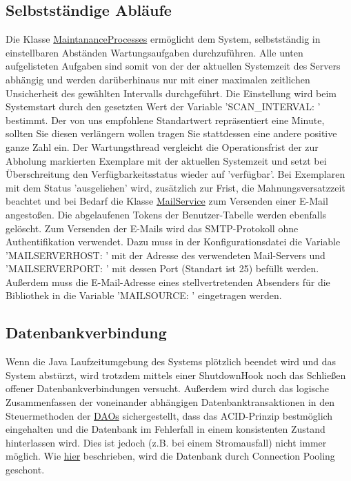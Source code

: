 \documentclass{article}
\begin{document}
\subsection{Selbstständige Abläufe}
Die Klasse \hyperlink{Logger}{MaintananceProcesses} ermöglicht dem System, selbstständig in einstellbaren Abständen Wartungsaufgaben durchzuführen. Alle unten aufgelisteten Aufgaben sind somit von der der aktuellen Systemzeit des Servers abhängig und werden darüberhinaus nur mit einer maximalen zeitlichen Unsicherheit des gewählten Intervalls durchgeführt. Die Einstellung wird beim Systemstart durch den gesetzten Wert der Variable 'SCAN\_INTERVAL: ' bestimmt. Der von uns empfohlene Standartwert repräsentiert eine Minute, sollten Sie diesen verlängern wollen tragen Sie stattdessen eine andere positive ganze Zahl ein. Der Wartungsthread vergleicht die Operationsfrist der zur Abholung markierten Exemplare mit der aktuellen Systemzeit und setzt bei Überschreitung den Verfügbarkeitsstatus wieder auf 'verfügbar'. Bei Exemplaren mit dem Status 'ausgeliehen' wird, zusätzlich zur Frist, die Mahnungsversatzzeit beachtet und bei Bedarf die Klasse \hyperlink{Session}{MailService} zum Versenden einer E-Mail angestoßen. Die abgelaufenen Tokens der Benutzer-Tabelle werden ebenfalls gelöscht. Zum Versenden der E-Mails wird das SMTP-Protokoll ohne Authentifikation verwendet. Dazu muss in der Konfigurationsdatei die Variable 'MAILSERVERHOST: ' mit der Adresse des verwendeten Mail-Servers und 'MAILSERVERPORT: ' mit dessen Port (Standart ist 25) befüllt werden. Außerdem muss die E-Mail-Adresse eines stellvertretenden Absenders für die Bibliothek in die Variable 'MAILSOURCE: ' eingetragen werden.
\subsection{Datenbankverbindung}
Wenn die Java Laufzeitumgebung des Systems plötzlich beendet wird und das System abstürzt, wird trotzdem mittels einer ShutdownHook noch das Schließen offener Datenbankverbindungen versucht. Außerdem wird durch das logische Zusammenfassen der voneinander abhängigen Datenbanktransaktionen in den Steuermethoden der \hyperlink{DAO}{DAOs} sichergestellt, dass das ACID-Prinzip bestmöglich eingehalten und die Datenbank im Fehlerfall in einem konsistenten Zustand hinterlassen wird. Dies ist jedoch (z.B. bei einem Stromausfall) nicht immer möglich. Wie \hyperlink{Pooling}{hier} beschrieben, wird die Datenbank durch Connection Pooling geschont.
\end{document}
